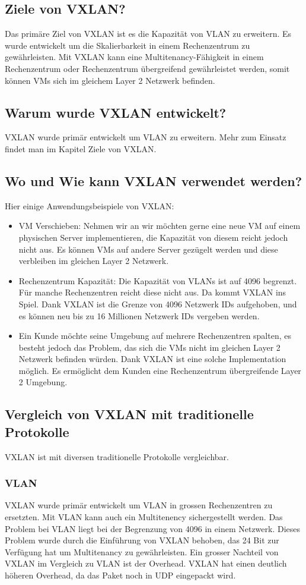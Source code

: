 \documentclass[a4,12pt]{scrartcl}
\begin{document}
\subsection{Ziele von VXLAN?}
Das primäre Ziel von VXLAN ist es die Kapazität von VLAN zu erweitern. Es wurde entwickelt um die Skalierbarkeit in einem Rechenzentrum zu gewährleisten. Mit VXLAN kann eine Multitenancy-Fähigkeit in einem Rechenzentrum oder Rechenzentrum übergreifend gewährleistet werden, somit können VMs sich im gleichem Layer 2 Netzwerk befinden. 

\subsection{Warum wurde VXLAN entwickelt?}
VXLAN wurde primär entwickelt um VLAN zu erweitern. Mehr zum Einsatz findet man im Kapitel Ziele von VXLAN. 

\subsection{Wo und Wie kann VXLAN verwendet werden?}
Hier einige Anwendungsbeispiele von VXLAN: 
\begin{itemize}
\item VM Verschieben: Nehmen wir an wir möchten gerne eine neue VM auf einem physischen Server implementieren, die Kapazität von diesem reicht jedoch nicht aus. Es können VMs auf andere Server gezügelt werden und diese verbleiben im gleichen Layer 2 Netzwerk. 
\item Rechenzentrum Kapazität: Die Kapazität von VLANs ist auf 4096 begrenzt. Für manche Rechenzentren reicht diese nicht aus. Da kommt VXLAN ins Spiel. Dank VXLAN ist die Grenze von 4096 Netzwerk IDs aufgehoben, und es können neu bis zu 16 Millionen Netzwerk IDs vergeben werden. 
\item Ein Kunde möchte seine Umgebung auf mehrere Rechenzentren spalten, es besteht jedoch das Problem, das sich die VMs nicht im gleichen Layer 2 Netzwerk befinden würden. Dank VXLAN ist eine solche Implementation möglich. Es ermöglicht dem Kunden eine Rechenzentrum übergreifende Layer 2 Umgebung. 
\end{itemize}

\subsection{Vergleich von VXLAN mit traditionelle Protokolle}
VXLAN ist mit diversen traditionelle Protokolle vergleichbar. 
\subsubsection{VLAN}
VXLAN wurde primär entwickelt um VLAN in grossen Rechenzentren zu ersetzten. Mit VLAN kann auch ein Multitenency sichergestellt werden. Das Problem bei VLAN liegt bei der Begrenzung von 4096 in einem Netzwerk. Dieses Problem wurde durch die Einführung von VXLAN behoben, das 24 Bit zur Verfügung hat um Multitenancy zu gewährleisten. Ein grosser Nachteil von VXLAN im Vergleich zu VLAN ist der Overhead. VXLAN hat einen deutlich höheren Overhead, da das Paket noch in UDP eingepackt wird. 
\end{document}
